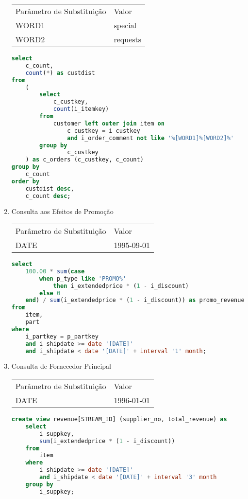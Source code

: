 \begin{enumerate}
\begin{tabular}{ll}
	Parâmetro de Substituição & Valor\\
	WORD1 & special\\
	WORD2 & requests\\
\end{tabular}

	\begin{lstlisting}[language=SQL]
select
    c_count,
    count(*) as custdist
from
    (
        select
            c_custkey,
            count(i_itemkey)
        from
            customer left outer join item on
                c_custkey = i_custkey
                and i_order_comment not like '%[WORD1]%[WORD2]%'
        group by
                c_custkey
    ) as c_orders (c_custkey, c_count)
group by
    c_count
order by
    custdist desc,
    c_count desc;
	\end{lstlisting}

\item Consulta aos Efeitos de Promoção

\begin{tabular}{ll}
	Parâmetro de Substituição & Valor\\
	DATE & 1995-09-01\\
\end{tabular}

	\begin{lstlisting}[language=SQL]
select
	100.00 * sum(case
		when p_type like 'PROMO%'
			then i_extendedprice * (1 - i_discount)
		else 0
	end) / sum(i_extendedprice * (1 - i_discount)) as promo_revenue
from
	item,
	part
where
	i_partkey = p_partkey
	and i_shipdate >= date '[DATE]'
	and i_shipdate < date '[DATE]' + interval '1' month;
	\end{lstlisting}

\item Consulta de Fornecedor Principal

\begin{tabular}{ll}
	Parâmetro de Substituição & Valor\\
	DATE & 1996-01-01\\
\end{tabular}

	\begin{lstlisting}[language=SQL]
create view revenue[STREAM_ID] (supplier_no, total_revenue) as
	select
		i_suppkey,
		sum(i_extendedprice * (1 - i_discount))
	from
		item
	where
		i_shipdate >= date '[DATE]'
		and i_shipdate < date '[DATE]' + interval '3' month
	group by
		i_suppkey;


\end{lstlisting}
\end{enumerate}
